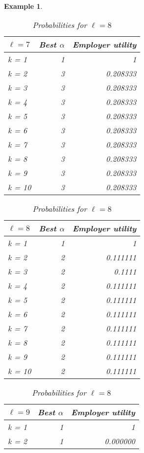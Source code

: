 \documentclass{article}
\newtheorem{example}{Example} %
\begin{document}
\begin{example}
\begin{table}[H]
\begin{minipage}{0.33\textwidth}
\small
\begin{tabular}{lrr}
\hline
$\ell=7$ & Best $\alpha$ & Employer utility \\
\hline
k = 1  &     1 &         1 \\
k = 2  &     3 &         0.208333 \\
k = 3  &     3 &         0.208333 \\
k = 4  &     3 &         0.208333 \\
k = 5  &     3 &         0.208333 \\
k = 6  &     3 &         0.208333 \\
k = 7  &     3 &         0.208333 \\
k = 8  &     3 &         0.208333 \\
k = 9  &     3 &         0.208333 \\
k = 10 &     3 &         0.208333 \\
\hline
\end{tabular}
\caption{Probabilities for $\ell=7$}
\end{minipage}\hfill
\centering
\begin{minipage}{0.33\textwidth}
\small
\begin{tabular}{lrr}
\hline
$\ell=8$ & Best $\alpha$ & Employer utility \\
\hline
k = 1  &     1 &         1 \\
k = 2  &     2 &         0.111111 \\
k = 3  &     2 &         0.1111 \\
k = 4  &     2 &         0.111111 \\
k = 5  &     2 &         0.111111 \\
k = 6  &     2 &         0.111111 \\
k = 7  &     2 &         0.111111 \\
k = 8  &     2 &         0.111111 \\
k = 9  &     2 &         0.111111 \\
k = 10 &     2 &         0.111111 \\
\hline
\end{tabular}
\caption{Probabilities for $\ell=8$}
\end{minipage}\hfill
\centering
\begin{minipage}{0.33\textwidth}
\small
\begin{tabular}{lrr}
\hline
$\ell=9$ & Best $\alpha$ & Employer utility \\
\hline
k = 1  &     1 &         1 \\
k = 2  &     1 &         0.000000 \\

\end{tabular}
\end{minipage}
\end{table}
\end{example}
\end{document}
